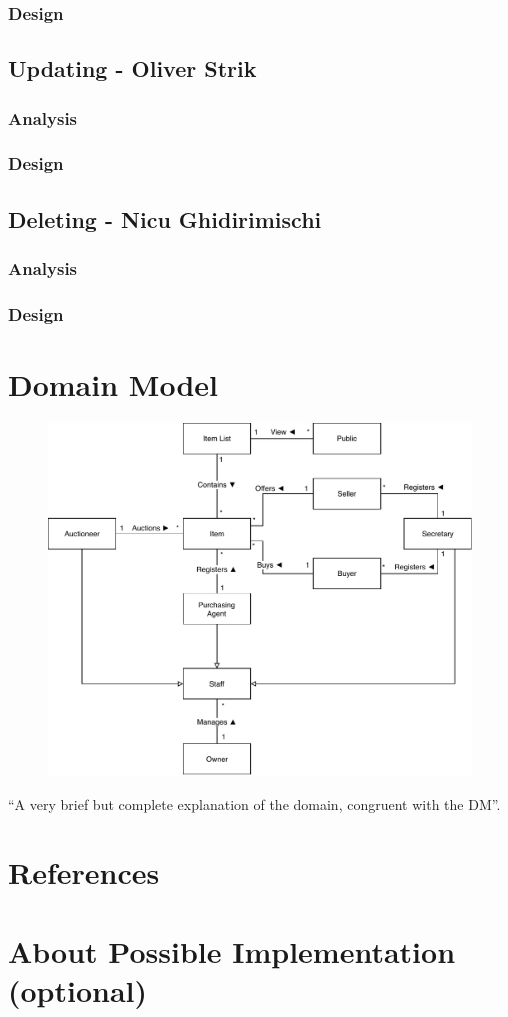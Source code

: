 \documentclass{article}
\begin{document}
\subsubsection*{Design}
\subsection*{Updating - Oliver Strik}
\subsubsection*{Analysis}
\subsubsection*{Design}
\subsection*{Deleting - Nicu Ghidirimischi}
\subsubsection*{Analysis}
\subsubsection*{Design}
\section*{Domain Model}
\begin{figure}[H]
	\centering
	\includegraphics[scale=.9]{domainmodel.pdf}
\end{figure}
``A very brief but complete explanation of the domain, congruent with the DM''.
\section*{References}
\section*{About Possible Implementation (optional)}

\end{document}
